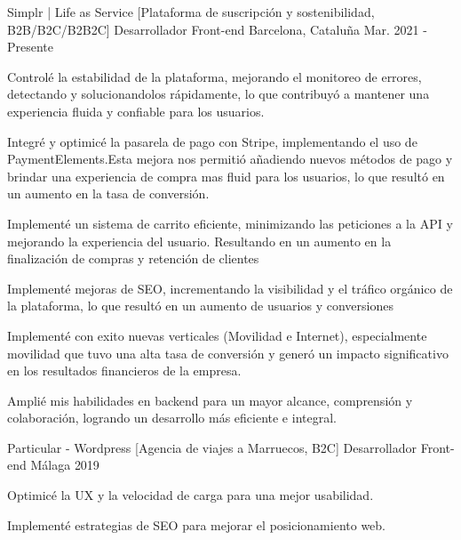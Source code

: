
\begin{cventries}
    \cventry
    {Simplr | Life as Service [Plataforma de suscripción y sostenibilidad, B2B/B2C/B2B2C]}
    {Desarrollador Front-end}
    {Barcelona, Cataluña}
    {Mar. 2021 - Presente}
    {
    \begin{cvitems}
        \item{Controlé la estabilidad de la plataforma, mejorando el monitoreo de errores, detectando y solucionandolos rápidamente, lo que contribuyó a mantener una experiencia fluida y confiable para los usuarios.}
        \item{Integré y optimicé la pasarela de pago con Stripe, implementando el uso de PaymentElements.Esta mejora nos permitió añadiendo nuevos métodos de pago y brindar una experiencia de compra mas fluid para los usuarios, lo que resultó en un aumento en la tasa de conversión.}
        \item{Implementé un sistema de carrito eficiente, minimizando las peticiones a la API y mejorando la experiencia del usuario. Resultando en un aumento en la finalización de compras y retención de clientes}
        \item{Implementé mejoras de SEO, incrementando la visibilidad y el tráfico orgánico de la plataforma, lo que resultó en un aumento de usuarios y conversiones}
        \item{Implementé con exito nuevas verticales (Movilidad e Internet), especialmente movilidad que tuvo una alta tasa de conversión y generó un impacto significativo en los resultados financieros de la empresa.}
        \item{Amplié mis habilidades en backend para un mayor alcance, comprensión y colaboración, logrando un desarrollo más eficiente e integral. }
    \end{cvitems}
    }

    \cventry
    {Particular - Wordpress [Agencia de viajes a Marruecos, B2C]}
    {Desarrollador Front-end}
    {Málaga}
    {2019}
    {
    \begin{cvitems}
        \item{Optimicé la UX y la velocidad de carga para una mejor usabilidad.}
        \item{Implementé estrategias de SEO para mejorar el posicionamiento web.}
    \end{cvitems}
    }


\end{cventries}
